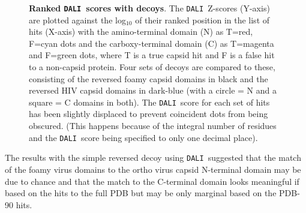 \documentclass{bmcart}
\newcommand{\DALI}{{\tt DALI}}
\begin{document}
\begin{figure}
\centering
{}
\begin{footnotesize}
\caption{
\label{Fig:revs}
{\bf Ranked \DALI\ scores with decoys}.
The \DALI\ Z-scores (Y-axis) are plotted against the log$_{10}$ of their ranked position in the
list of hits (X-axis) with the amino-terminal domain (N) as T=red, F=cyan dots and the carboxy-terminal domain (C)
as T=magenta and F=green dots, where T is a true capsid hit and F is a false hit to a non-capsid protein.
Four sets of decoys are compared to these, consisting of the reversed foamy capsid domains in
black and the reversed HIV capsid domains in dark-blue (with a circle = N and a square = C domains in both).
The \DALI\ score for each set of hits has been slightly displaced to prevent coincident dots from being
obscured.  (This happens because of the integral number of residues and the \DALI\ score being specified
to only one decimal place).
}
\end{footnotesize}
\end{figure}

The results with the simple reversed decoy using \DALI\, suggested that the match of the foamy virus domains to the
ortho virus capsid N-terminal domain may be due to chance and that the match to the C-terminal domain looks
meaningful if based on the hits to the full PDB but may be only marginal based on the PDB-90 hits.
\end{document}
